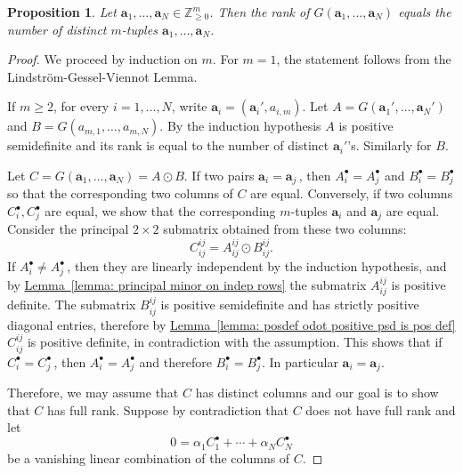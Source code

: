 \documentclass[11pt]{article}
\numberwithin{equation}{section}
\newtheorem{proposition}[theorem]{Proposition}
\theoremstyle{definition}
\theoremstyle{plain}
\newcommand{\expref}[2]{\hyperref[#2]{#1~\ref{#2}}}
\newcommand{\vvirg}{ , \dots , }
\newcommand{\bfa}{\mathbf{a}}
\newcommand{\bbZ}{\mathbb{Z}}
\begin{document}
\begin{proposition}\label{prop: hadamard product of many gessel viennot}
Let $\bfa_1 \vvirg \bfa_N \in \bbZ^m_{\geq 0}$. Then the rank of $G(\bfa_1 \vvirg \bfa_N)$ equals the number of distinct $m$-tuples $\bfa_1 \vvirg \bfa_N$. 
\end{proposition}
\begin{proof}
We proceed by induction on $m$. For $m=1$, the statement follows from the Lindstr\"om-Gessel-Viennot Lemma.

If $m\geq 2$, for every $i=1 \vvirg N$, write $\bfa_i = (\bfa_i',a_{i,m})$. Let $A = G(\bfa_1' \vvirg \bfa_N')$ and $B= G(a_{m,1} \vvirg a_{m,N})$. By the induction hypothesis $A$ is positive semidefinite and its rank is equal to the number of distinct $\bfa_i'$'s. Similarly for $B$.

Let $C =  G(\bfa_1 \vvirg \bfa_N) = A \odot B$. If two pairs $\bfa_i = \bfa_j$\,, then $A^\bullet_i = A^\bullet_j$ and $B^\bullet_i = B^\bullet_j$ so that the corresponding two columns of $C$ are equal. Conversely, if two columns $C^\bullet_i,C^\bullet_j$ are equal, we show that the corresponding $m$-tuples $\bfa_i$ and $\bfa_j$ are equal. Consider the principal $2\times2$ submatrix obtained from these two columns:
\[
 C^{ij}_{ij} = A^{ij}_{ij} \odot B^{ij}_{ij}.
\]
If $A^\bullet_i \neq A^\bullet_j$\,, then they are linearly independent by the induction hypothesis, and by \expref{Lemma}{lemma: principal minor on indep rows} the submatrix $A^{ij}_{ij}$ is positive definite. The submatrix $B^{ij}_{ij}$ is positive semidefinite and has strictly positive diagonal entries, therefore by \expref{Lemma}{lemma: posdef odot positive psd is pos def} $C^{ij}_{ij}$ is positive definite, in contradiction with the assumption. This shows that if $C^\bullet_i = C^\bullet_j$\,, then $A^\bullet_i = A^\bullet_j$ and therefore $B^\bullet_i = B^\bullet_j$. In particular $\bfa_i = \bfa_j$.

Therefore, we may assume that $C$ has distinct columns and our goal is to show that $C$ has full rank. Suppose by contradiction that $C$ does not have full rank and let
\begin{equation}\label{eqn: vanishing linear combination of C}
0 = \alpha_1  C^\bullet_1 + \cdots + \alpha_N C^\bullet_N
\end{equation}
be a vanishing linear combination of the columns of $C$.


\end{proof}
\end{document}
